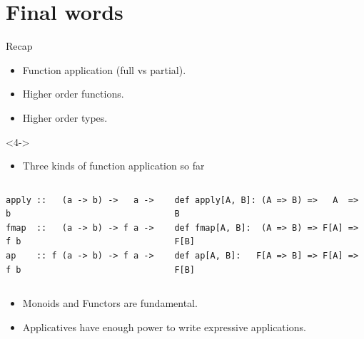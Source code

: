 \documentclass[presentation,aspectratio=169,smaller]{beamer}
\begin{document}
\section*{Final words}
\label{sec:org2392a87}
\begin{frame}[label={sec:org60b6dc0},fragile]{Recap}
 \begin{onlyenv}
\begin{itemize}
\item <1-> Function application (full vs partial).
\item <2-> Higher order functions.
\item <3-> Higher order types.
\end{itemize}
\end{onlyenv}

\begin{onlyenv}<4->
\begin{itemize}
\item Three kinds of function application so far
\end{itemize}

\begin{columns}
\begin{column}{0.35\columnwidth}
\begin{verbatim}
apply ::   (a -> b) ->   a ->   b
fmap  ::   (a -> b) -> f a -> f b
ap    :: f (a -> b) -> f a -> f b
\end{verbatim}
\end{column}

\begin{column}{0.35\columnwidth}
\begin{verbatim}
def apply[A, B]: (A => B) =>   A  =>   B
def fmap[A, B]:  (A => B) => F[A] => F[B]
def ap[A, B]:   F[A => B] => F[A] => F[B]
\end{verbatim}
\end{column}
\end{columns}
\end{onlyenv}

\begin{onlyenv}
\begin{itemize}
\item <5-> Monoids and Functors are fundamental.
\item <6-> Applicatives have enough power to write expressive applications.
\end{itemize}
\end{onlyenv}
\end{frame}
\end{document}
